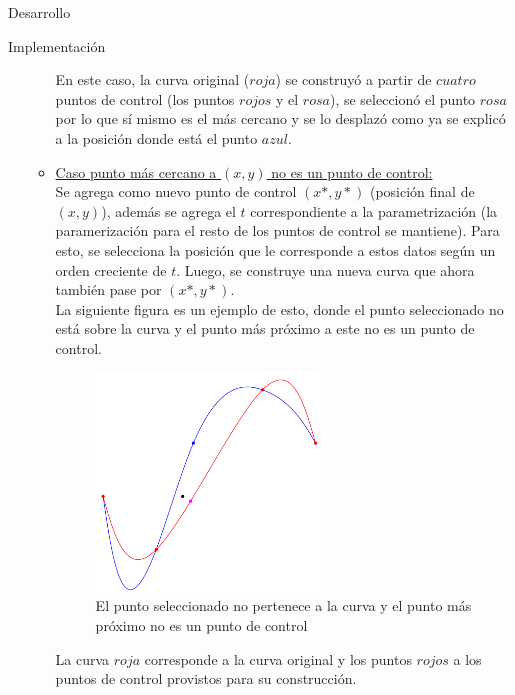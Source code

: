 \begin{section}{Desarrollo}
\begin{subsection}{Implementación}
\begin{itemize}
\begin{itemize}
						\VSP
						
						En este caso, la curva original ($roja$) se construyó a partir de $cuatro$ puntos de control (los puntos $rojos$ y el $rosa$), se seleccionó el punto $rosa$ por lo que sí mismo es el más cercano y se lo desplazó
						como ya se explicó a la posición donde está el punto $azul$.
						
						\VSP 
					
					\item \underline{Caso punto más cercano a $(x,y)$ no es un punto de control:}\\
					
						Se agrega como nuevo punto de control $(x*,y*)$ (posición final de $(x,y)$), además se agrega el $t$ correspondiente a la parametrización (la paramerización para el resto de los puntos de control se mantiene).
						Para esto, se selecciona la posición que le corresponde a estos datos según un orden creciente de $t$. Luego, se construye una nueva curva que ahora también pase por $(x*,y*)$.\\
						
						La siguiente figura es un ejemplo de esto, donde el punto seleccionado no está sobre la curva y el punto más próximo a este no es un punto de control.\\
						
						\begin{figure}[H]
							\centering
							\includegraphics[width=6cm]{graficos/noPtoCtrl_noSobreCurva.pdf}
							\caption{El punto seleccionado no pertenece a la curva y el punto más próximo no es un punto de control}
							\label{fig:noPtoCtrl_noSobreCurva}
						\end{figure}
						
						\VSP
						
						La curva $roja$ corresponde a la curva original y los puntos $rojos$ a los puntos de control provistos para su construcción.
						

\end{itemize}
\end{itemize}
\end{subsection}
\end{section}
